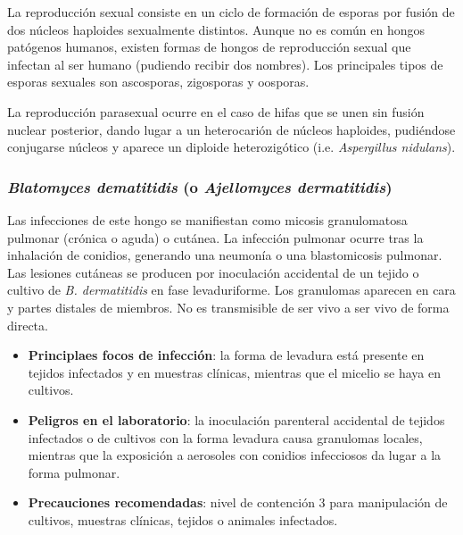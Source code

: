 La reproducción sexual consiste en un ciclo de formación de esporas por fusión de dos núcleos haploides sexualmente distintos. Aunque no es común en hongos patógenos humanos, existen formas de hongos de reproducción sexual que infectan al ser humano (pudiendo recibir dos nombres). Los principales tipos de esporas sexuales son ascosporas, zigosporas y oosporas.

La reproducción parasexual ocurre en el caso de hifas que se unen sin fusión nuclear posterior, dando lugar a un heterocarión de núcleos haploides, pudiéndose conjugarse núcleos y aparece un diploide heterozigótico (i.e. \textit{Aspergillus nidulans}).
\subsubsection{\textit{Blatomyces dematitidis} (o \textit{Ajellomyces dermatitidis})}
Las infecciones de este hongo se manifiestan como micosis granulomatosa pulmonar (crónica o aguda) o cutánea. La infección pulmonar ocurre tras la inhalación de conidios, generando una neumonía o una blastomicosis pulmonar. Las lesiones cutáneas se producen por inoculación accidental de un tejido o cultivo de \textit{B. dermatitidis} en fase levaduriforme. Los granulomas aparecen en cara y partes distales de miembros. No es transmisible de ser vivo a ser vivo de forma directa.
\begin{itemize}[itemsep=0pt,parsep=0pt,topsep=0pt,partopsep=0pt]
    \item \textbf{Principlaes focos de infección}: la forma de levadura está presente en tejidos infectados y en muestras clínicas, mientras que el micelio se haya en cultivos.
    \item \textbf{Peligros en el laboratorio}: la inoculación parenteral accidental de tejidos infectados o de cultivos con la forma levadura causa granulomas locales, mientras que la exposición a aerosoles con conidios infecciosos da lugar a la forma pulmonar.
    \item \textbf{Precauciones recomendadas}: nivel de contención 3 para manipulación de cultivos, muestras clínicas, tejidos o animales infectados.
\end{itemize}
